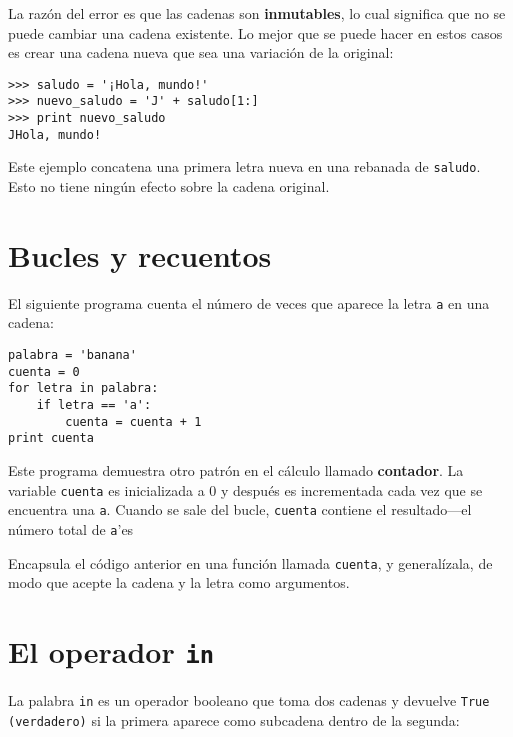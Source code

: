 La razón del error es que las
cadenas son {\bf inmutables}, lo cual significa que no se puede
cambiar una cadena existente. Lo mejor que se puede hacer en estos casos es
crear una cadena nueva que sea una variación de la original:

\beforeverb
\begin{verbatim}
>>> saludo = '¡Hola, mundo!'
>>> nuevo_saludo = 'J' + saludo[1:]
>>> print nuevo_saludo
JHola, mundo!
\end{verbatim}
\afterverb
%
Este ejemplo concatena una primera letra nueva en
una rebanada de {\tt saludo}. Esto no tiene ningún efecto
sobre la cadena original.


\section{Bucles y recuentos}
\label{counter}


El siguiente programa cuenta el número de veces que aparece la letra
{\tt a} en una cadena:

\beforeverb
\begin{verbatim}
palabra = 'banana'
cuenta = 0
for letra in palabra:
    if letra == 'a':
        cuenta = cuenta + 1
print cuenta
\end{verbatim}
\afterverb
%
Este programa demuestra otro patrón en el cálculo llamado {\bf contador}.
La variable {\tt cuenta} es inicializada a 0 y después
es incrementada cada vez que se encuentra una {\tt a}.
Cuando se sale del bucle, {\tt cuenta}
contiene el resultado---el número total de {\tt a}'es

\begin{ex}

Encapsula el código anterior en una función llamada
{\tt cuenta}, y generalízala, de modo que acepte la cadena y la
letra como argumentos.
\end{ex}

\section{El operador {\tt in}}
\label{inboth}


La palabra {\tt in} es un operador booleano que toma dos cadenas y
devuelve {\tt True (verdadero)} si la primera aparece como subcadena
dentro de la segunda:

